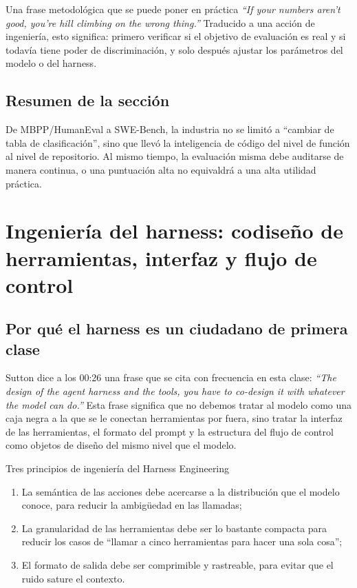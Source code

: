 \documentclass[a4paper]{article}
\begin{document}
\begin{importantbox}{Una frase metodológica que se puede poner en práctica}
\textit{``If your numbers aren't good, you're hill climbing on the wrong thing.''}  
Traducido a una acción de ingeniería, esto significa: primero verificar si el objetivo de evaluación es real y si todavía tiene poder de discriminación, y solo después ajustar los parámetros del modelo o del harness.
\end{importantbox}

\subsection{Resumen de la sección}
De MBPP/HumanEval a SWE-Bench, la industria no se limitó a ``cambiar de tabla de clasificación'', sino que llevó la inteligencia de código del nivel de función al nivel de repositorio. Al mismo tiempo, la evaluación misma debe auditarse de manera continua, o una puntuación alta no equivaldrá a una alta utilidad práctica.

\section{Ingeniería del harness: codiseño de herramientas, interfaz y flujo de control}

\subsection{Por qué el harness es un ciudadano de primera clase}
Sutton dice a los 00:26 una frase que se cita con frecuencia en esta clase: \textit{``The design of the agent harness and the tools, you have to co-design it with whatever the model can do.''}
Esta frase significa que no debemos tratar al modelo como una caja negra a la que se le conectan herramientas por fuera, sino tratar la interfaz de las herramientas, el formato del prompt y la estructura del flujo de control como objetos de diseño del mismo nivel que el modelo.

\begin{importantbox}{Tres principios de ingeniería del Harness Engineering}
\begin{enumerate}
    \item La semántica de las acciones debe acercarse a la distribución que el modelo conoce, para reducir la ambigüedad en las llamadas;
    \item La granularidad de las herramientas debe ser lo bastante compacta para reducir los casos de ``llamar a cinco herramientas para hacer una sola cosa'';
    \item El formato de salida debe ser comprimible y rastreable, para evitar que el ruido sature el contexto.
\end{enumerate}
\end{importantbox}
\end{document}
